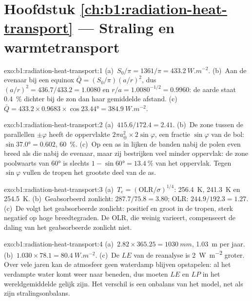\section*{Hoofdstuk \ref{ch:b1:radiation-heat-transport} --- Straling en warmtetransport}

\begin{solution}{exo:b1:radiation-heat-transport:1}
(a)~$S_0/\pi = 1361/\pi = \qty{433.2}{W.m^{-2}}$. (b)~Aan de evenaar bij een equinox
$\bar Q = (S_0/\pi)(a/r)^2$, dus $(a/r)^2 = 436.7/433.2 = 1.0080$ en $r/a =
1.0080^{-1/2} = 0.9960$: de aarde staat \qty{0.4}{\percent} dichter bij de zon dan
haar gemiddelde afstand. (c)~$\bar Q = 433.2 \times 0.9683 \times \cos\ang{23.44} =
\qty{384.9}{W.m^{-2}}$.
\end{solution}

\begin{solution}{exo:b1:radiation-heat-transport:2}
(a)~$415.6/172.4 = 2.41$. (b)~De zone tussen de parallellen $\pm\varphi$ heeft de
oppervlakte $2\pi a_\oplus^2 \times 2\sin\varphi$, een fractie $\sin\varphi$ van de bol:
$\sin\ang{37.0} = 0.602$, \qty{60}{\percent}. (c)~Op een as in  lijken de
banden nabij de polen even breed als die nabij de evenaar, maar zij bestrijken veel
minder oppervlak: de zone poolwaarts van \ang{60} is slechts $1 - \sin\ang{60} =
\qty{13.4}{\percent}$ van het oppervlak. Tegen $\sin\varphi$ vullen de tropen het
grootste deel van de as.
\end{solution}

\begin{solution}{exo:b1:radiation-heat-transport:3}
(a)~$T_e = (\text{OLR}/\sigma)^{1/4}$: \qty{256.4}{K}, \qty{241.3}{K} en
\qty{254.5}{K}. (b)~Geabsorbeerd zonlicht: $287.7/75.8 = 3.80$; OLR: $244.9/192.3 =
1.27$. (c)~De  volgt het geabsorbeerde zonlicht: positief en groot in de
tropen, sterk negatief op hoge breedtegraden. De OLR, die weinig varieert, compenseert
de daling van het geabsorbeerde zonlicht niet.
\end{solution}

\begin{solution}{exo:b1:radiation-heat-transport:4}
(a)~$2.82 \times 365.25 = \qty{1030}{mm}$, \qty{1.03}{m} per jaar. (b)~$1.030 \times
78.1 = \qty{80.4}{W.m^{-2}}$.
(c)~De $LE$ van de reanalyse is \qty{2}{W.m^{-2}} groter. Over vele jaren kan de atmosfeer
geen waterdamp blijven opstapelen: al het verdampte water komt weer naar beneden, dus moeten $LE$ en $LP$ in het wereldgemiddelde gelijk zijn. Het verschil is een onbalans van het model, net als zijn stralingsonbalans.
\end{solution}

